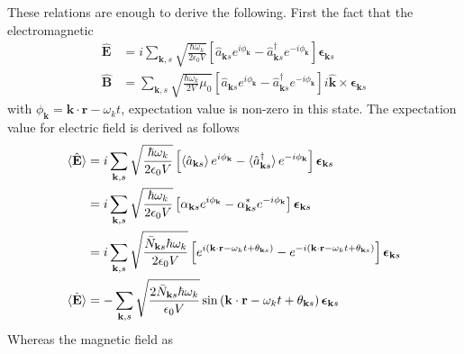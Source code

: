 \documentclass[../../../main.tex]{subfiles}
\begin{document}
These relations are enough to derive the following.
First the fact that the electromagnetic
\begin{align*}
  \hat{\mathbf{E}} & =  i \sum_{\mathbf{k},s} \sqrt{\frac{\hbar \omega_k}{2 \epsilon_0 V}} \left[ \hat{a}_{\mathbf{k}s} e^{i\phi_{\mathbf{k}}} - \hat{a}_{\mathbf{k}s}^{\dagger} e^{-i\phi_{\mathbf{k}}} \right] \boldsymbol{\epsilon}_{\mathbf{k}s}                    \\
  \hat{\mathbf{B}} & =  \sum_{\mathbf{k},s} \sqrt{\frac{\hbar \omega_k}{2 V} \mu_0} \left[ \hat{a}_{\mathbf{k}s} e^{i\phi_{\mathbf{k}}} - \hat{a}_{\mathbf{k}s}^{\dagger} e^{-i\phi_{\mathbf{k}}} \right] i \mathbf{\hat{k}} \times \boldsymbol{\epsilon}_{\mathbf{k}s}
\end{align*}
with $\phi_{\mathbf{k }}=\mathbf{k }\cdot \mathbf{r }-\omega_kt$,    expectation value is non-zero in this state.
The expectation value for electric field is derived as follows
\begin{align*}
  \braket{  \hat{\mathbf{E}}  }
   & =  i \sum_{\mathbf{k},s} \sqrt{\frac{\hbar \omega_k}{2 \epsilon_0 V}} \left[ \braket{\hat{a}_{\mathbf{k}s}  } e^{i\phi_{\mathbf{k}}} - \braket{\hat{a}_{\mathbf{k}s}^{\dagger}} e^{-i\phi_{\mathbf{k}}} \right] \boldsymbol{\epsilon}_{\mathbf{k}s}                                            \\
   & =  i \sum_{\mathbf{k},s} \sqrt{\frac{\hbar \omega_k}{2 \epsilon_0 V}} \left[ \alpha_{\mathbf{k }s} e^{i\phi_{\mathbf{k}}} - \alpha_{\mathbf{k }s}^* e^{-i\phi_{\mathbf{k}}} \right] \boldsymbol{\epsilon}_{\mathbf{k}s}                                                                        \\
   & =  i \sum_{\mathbf{k},s} \sqrt{\frac{\bar{N}_{\mathbf{k}s}\hbar \omega_k }{2 \epsilon_0 V}} \left[  e^{i(\mathbf{k} \cdot \mathbf{r} - \omega_k t+ \theta_{\mathbf{k}s})} - e^{-i(\mathbf{k} \cdot \mathbf{r} - \omega_k t+\theta_{\mathbf{k}s}) } \right] \boldsymbol{\epsilon}_{\mathbf{k}s} \\
  \braket{  \hat{\mathbf{E}}  }
   & =  - \sum_{\mathbf{k},s} \sqrt{\frac{2\bar{N}_{\mathbf{k}s}\hbar \omega_k }{ \epsilon_0 V}}  \sin   \left( \mathbf{k} \cdot \mathbf{r} - \omega_k t+\theta_{\mathbf{k}s}  \right) \boldsymbol{\epsilon}_{\mathbf{k}s}
\end{align*}
Whereas the magnetic field as
\end{document}
